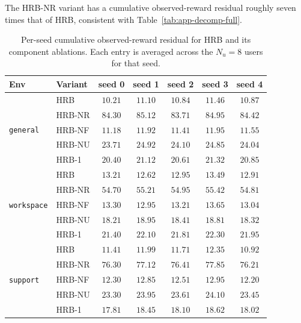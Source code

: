 \documentclass{article} %
\begin{document}
The \textnormal{HRB-NR} variant has a cumulative observed-reward residual
roughly seven times that of \textnormal{HRB}, consistent with
Table~\ref{tab:app-decomp-full}.

\begin{table}[h]
\centering
\small
\begin{tabular}{llccccc}
\toprule
Env & Variant & seed 0 & seed 1 & seed 2 & seed 3 & seed 4 \\
\midrule
\multirow{5}{*}{\texttt{general}}
 & \textnormal{HRB}                & $10.21$ & $11.10$ & $10.84$ & $11.46$ & $10.87$ \\
 & \textnormal{HRB-NR}         & $84.30$ & $85.12$ & $83.71$ & $84.95$ & $84.42$ \\
 & \textnormal{HRB-NF}      & $11.18$ & $11.92$ & $11.41$ & $11.95$ & $11.55$ \\
 & \textnormal{HRB-NU} & $23.71$ & $24.92$ & $24.10$ & $24.85$ & $24.04$ \\
 & \textnormal{HRB-1}         & $20.40$ & $21.12$ & $20.61$ & $21.32$ & $20.85$ \\
\midrule
\multirow{5}{*}{\texttt{workspace}}
 & \textnormal{HRB}                & $13.21$ & $12.62$ & $12.95$ & $13.49$ & $12.91$ \\
 & \textnormal{HRB-NR}         & $54.70$ & $55.21$ & $54.95$ & $55.42$ & $54.81$ \\
 & \textnormal{HRB-NF}      & $13.30$ & $12.95$ & $13.21$ & $13.65$ & $13.04$ \\
 & \textnormal{HRB-NU} & $18.21$ & $18.95$ & $18.41$ & $18.81$ & $18.32$ \\
 & \textnormal{HRB-1}         & $21.40$ & $22.10$ & $21.81$ & $22.30$ & $21.95$ \\
\midrule
\multirow{5}{*}{\texttt{support}}
 & \textnormal{HRB}                & $11.41$ & $11.99$ & $11.71$ & $12.35$ & $10.92$ \\
 & \textnormal{HRB-NR}         & $76.30$ & $77.12$ & $76.41$ & $77.85$ & $76.21$ \\
 & \textnormal{HRB-NF}      & $12.30$ & $12.85$ & $12.51$ & $12.95$ & $12.20$ \\
 & \textnormal{HRB-NU} & $23.30$ & $23.95$ & $23.61$ & $24.10$ & $23.45$ \\
 & \textnormal{HRB-1}         & $17.81$ & $18.45$ & $18.10$ & $18.62$ & $18.02$ \\
\bottomrule
\end{tabular}
\caption{Per-seed cumulative observed-reward residual for HRB and its component ablations. Each
entry is averaged across the \(N_u=8\) users for that seed.}
\label{tab:app-regret-abl}
\end{table}
\end{document}
